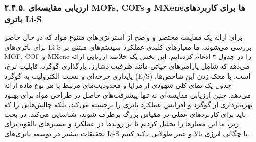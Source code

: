 \documentclass[12pt,a4paper,twocolumn]{article} %
\newcommand{\persian}[1]{\textfarsi{#1}}
\newcommand{\english}[1]{\textenglish{#1}}
\begin{document}
\subsubsection*{\persian{۲.۴.۵. ارزیابی مقایسه‌ای \english{MOFs}, \english{COFs} و \english{MXene}ها برای کاربردهای باتری \english{Li-S}}}
\persian{
برای ارائه یک مقایسه مختصر و واضح از استراتژی‌های متنوع مواد که در حال حاضر برای باتری‌های \english{Li-S} بررسی می‌شوند، ما معیارهای کلیدی عملکرد سیستم‌های مبتنی بر \english{MOF}, \english{COF} و \english{MXene} را در جدول ۳ ادغام کرده‌ایم. این بخش یک خلاصه ارزیابی ارائه می‌دهد که شامل پارامترهای حیاتی مانند ظرفیت دشارژ، بارگذاری گوگرد، قابلیت نرخ، پایداری چرخه‌ای و نسبت الکترولیت به گوگرد (\english{E/S}) است. با محک زدن این شاخص‌ها، جدول یک نمای کلی شهودی از مزایا و محدودیت‌های مرتبط با هر نوع ماده ارائه می‌دهد. چنین ارزیابی مقایسه‌ای نه تنها پیشرفت‌های حاصل در طراحی مواد برای بهبود بهره‌برداری از گوگرد و افزایش عملکرد باتری را برجسته می‌کند، بلکه چالش‌هایی را که باید برای کاربردهای عملی در مقیاس بزرگ برطرف شوند، شناسایی می‌کند. در بحث زیر، ما این معیارها را تحلیل کردیم تا بر روندها در عملکرد و مسیرهای بالقوه برای تحقیقات بیشتر در توسعه باتری‌های \english{Li-S} با چگالی انرژی بالا و عمر طولانی تأکید کنیم.
}
\end{document}
